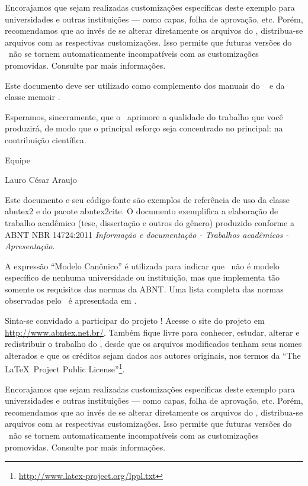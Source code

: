 \documentclass[
	12pt,				%
	openright,			%
    twoside,			%
	a4paper,			%
	english,			%
	french,				%
	spanish,			%
	brazil				%
	]{abntex2}
\numberwithin{lema}{chapter}
\numberwithin{teorema}{chapter}
\numberwithin{definicao}{chapter}
\numberwithin{figure}{chapter}
\begin{document}
Encorajamos que sejam realizadas customizações específicas deste exemplo para
universidades e outras instituições --- como capas, folha de aprovação, etc.
Porém, recomendamos que ao invés de se alterar diretamente os arquivos do
\abnTeX, distribua-se arquivos com as respectivas customizações.
Isso permite que futuras versões do \abnTeX~não se tornem automaticamente
incompatíveis com as customizações promovidas. Consulte
 par mais informações.

Este documento deve ser utilizado como complemento dos manuais do \abnTeX\ 
\cite{abntex2classe,abntex2cite,abntex2cite-alf} e da classe \textsf{memoir}
\cite{memoir}. 

Esperamos, sinceramente, que o \abnTeX\ aprimore a qualidade do trabalho que
você produzirá, de modo que o principal esforço seja concentrado no principal:
na contribuição científica.

Equipe \abnTeX 

Lauro César Araujo


Este documento e seu código-fonte são exemplos de referência de uso da classe
\textsf{abntex2} e do pacote \textsf{abntex2cite}. O documento 
exemplifica a elaboração de trabalho acadêmico (tese, dissertação e outros do
gênero) produzido conforme a ABNT NBR 14724:2011 \emph{Informação e documentação
- Trabalhos acadêmicos - Apresentação}.

A expressão ``Modelo Canônico'' é utilizada para indicar que \abnTeX\ não é
modelo específico de nenhuma universidade ou instituição, mas que implementa tão
somente os requisitos das normas da ABNT. Uma lista completa das normas
observadas pelo \abnTeX\ é apresentada em \citeonline{abntex2classe}.

Sinta-se convidado a participar do projeto \abnTeX! Acesse o site do projeto em
\url{http://www.abntex.net.br/}. Também fique livre para conhecer,
estudar, alterar e redistribuir o trabalho do \abnTeX, desde que os arquivos
modificados tenham seus nomes alterados e que os créditos sejam dados aos
autores originais, nos termos da ``The \LaTeX\ Project Public
License''\footnote{\url{http://www.latex-project.org/lppl.txt}}.

Encorajamos que sejam realizadas customizações específicas deste exemplo para
universidades e outras instituições --- como capas, folha de aprovação, etc.
Porém, recomendamos que ao invés de se alterar diretamente os arquivos do
\abnTeX, distribua-se arquivos com as respectivas customizações.
Isso permite que futuras versões do \abnTeX~não se tornem automaticamente
incompatíveis com as customizações promovidas. Consulte
 par mais informações.
\end{document}
